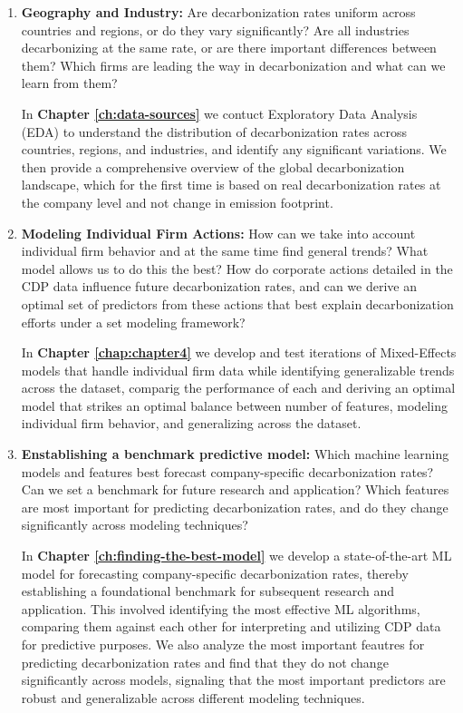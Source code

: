 \begin{enumerate}

    \item \textbf{Geography and Industry:} Are decarbonization rates uniform across countries and regions, or do they vary significantly? Are all industries decarbonizing at the same rate, or are there important differences between them? Which firms are leading the way in decarbonization and what can we learn from them?


    In \textbf{Chapter \ref{ch:data-sources}} we contuct Exploratory Data Analysis (EDA) to understand the distribution of decarbonization rates across countries, regions, and industries, and identify any significant variations. We then provide a comprehensive overview of the global decarbonization landscape, which for the first time is based on real decarbonization rates at the company level and not change in emission footprint. 


    \item \textbf{Modeling Individual Firm Actions:} How can we take into account individual firm behavior and at the same time find general trends? What model allows us to do this the best? How do corporate actions detailed in the CDP data influence future decarbonization rates, and can we derive an optimal set of predictors from these actions that best explain decarbonization efforts under a set modeling framework?

    In \textbf{Chapter \ref{chap:chapter4}} we develop and test iterations of Mixed-Effects models that handle individual firm data while identifying generalizable trends across the dataset, comparig the performance of each and deriving an optimal model that strikes an optimal balance between number of features, modeling individual firm behavior, and generalizing across the dataset.

    \item \textbf{Enstablishing a benchmark predictive model:} Which machine learning models and features best forecast company-specific decarbonization rates? Can we set a benchmark for future research and application? Which features are most important for predicting decarbonization rates, and do they change significantly across modeling techniques?
    
    In \textbf{Chapter \ref{ch:finding-the-best-model}} we develop a state-of-the-art ML model for forecasting company-specific decarbonization rates, thereby establishing a foundational benchmark for subsequent research and application. This involved identifying the most effective ML algorithms, comparing them against each other for interpreting and utilizing CDP data for predictive purposes. We also analyze the most important feautres for predicting decarbonization rates and find that they do not change significantly across models, signaling that the most important predictors are robust and generalizable across different modeling techniques. 
    

\end{enumerate}
